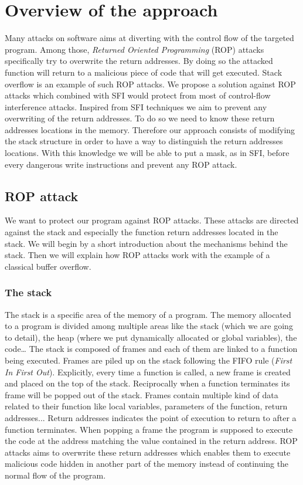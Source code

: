 \documentclass[11pt]{sdm}
\begin{document}
\section{Overview of the approach}
\label{sec:Overview of the approach}
	Many attacks on software aims at diverting with the control flow of the targeted program. Among those, \textit{Returned Oriented Programming} (ROP) attacks specifically try to overwrite the return addresses.
By doing so the attacked function will return to a malicious piece of code that will get executed.
Stack overflow is an example of such ROP attacks.
We propose a solution against ROP attacks which combined with SFI would protect from most of control-flow interference attacks.
Inspired from SFI techniques we aim to prevent any overwriting of the return addresses. To do so we need to know these return addresses locations in the memory. Therefore our approach consists of modifying the stack structure in order to have a way to distinguish the return addresses locations. With this knowledge we will be able to put a mask, as in SFI, before every dangerous write instructions and prevent any ROP attack.

\subsection{ROP attack}
\label{sub:Issue}

	We want to protect our program against ROP attacks. These attacks are directed against the stack and especially the function return addresses located in the stack.
We will begin by a short introduction about the mechanisms behind the stack. Then we will explain how ROP attacks work with the example of a classical buffer overflow.

\subsubsection{The stack}
\label{ssub:The stack}
	The stack is a specific area of the memory of a program. The memory allocated to a program is divided among multiple areas like the stack (which we are going to detail), the heap (where we put dynamically allocated or global variables), the code\dots
The stack is composed of frames and each of them are linked to a function being executed. Frames are piled up on the stack following the FIFO rule (\textit{First In First Out}). Explicitly, every time a function is called, a new frame is created and placed on the top of the stack. Reciprocally when a function terminates its frame will be popped out of the stack.
Frames contain multiple kind of data related to their function like local variables, parameters of the function, return addresses... Return addresses indicates the point of execution to return to after a function terminates. When popping a frame the program is supposed to execute the code at the address matching the value contained in the return address.
ROP attacks aims to overwrite these return addresses which enables them to execute malicious code hidden in another part of the memory instead of continuing the normal flow of the program.
\end{document}
